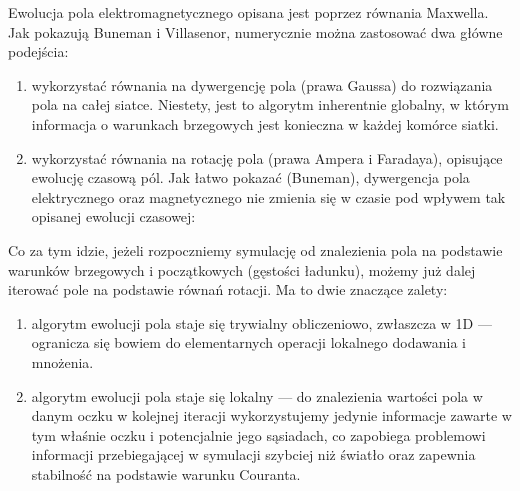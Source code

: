 Ewolucja pola elektromagnetycznego opisana jest poprzez równania Maxwella.
Jak pokazują Buneman i Villasenor, numerycznie można zastosować dwa główne
podejścia:~\cite{bunemanvillasenor}

\begin{enumerate}
    \item wykorzystać równania na dywergencję pola (prawa Gaussa) do
    rozwiązania pola na całej siatce. Niestety, jest to algorytm
    inherentnie globalny, w którym informacja o warunkach brzegowych
    jest konieczna w każdej komórce siatki.

    \item wykorzystać równania na rotację pola (prawa Ampera i Faradaya),
    opisujące ewolucję czasową pól. Jak łatwo pokazać (Buneman), dywergencja
    pola elektrycznego oraz magnetycznego nie zmienia się w czasie pod
    wpływem tak opisanej ewolucji czasowej:
\end{enumerate}

Co za tym idzie, jeżeli rozpoczniemy symulację od znalezienia pola na
podstawie warunków brzegowych i początkowych (gęstości ładunku), możemy już
dalej iterować pole na podstawie równań rotacji. Ma to dwie znaczące
zalety:

\begin{enumerate}
\item algorytm ewolucji pola staje się trywialny obliczeniowo,
zwłaszcza w 1D --- ogranicza się bowiem do elementarnych operacji lokalnego
dodawania i mnożenia.

\item algorytm ewolucji pola staje się lokalny --- do
znalezienia wartości pola w danym oczku w kolejnej iteracji wykorzystujemy
jedynie informacje zawarte w tym właśnie oczku i potencjalnie jego
sąsiadach, co zapobiega
problemowi informacji przebiegającej w symulacji szybciej niż światło oraz
zapewnia stabilność na podstawie warunku Couranta.
\end{enumerate}


%
%
%

